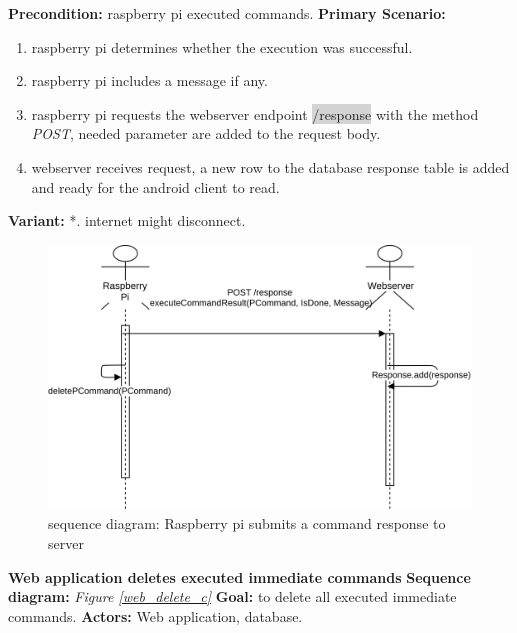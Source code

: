 \documentclass[12pt, oneside, a4paper]{book}
\newcommand{\code}[1]{{\color{red}\colorbox{lightgray}{#1}}}
\newcommand\boldcolor[1]{\textcolor{bold}{\textbf{#1}}}
\begin{document}
				\newline\textbf{Precondition:} raspberry pi executed commands.
				\newline\textbf{Primary Scenario:}	
				\begin{enumerate}[label*=\arabic*.]
					\item raspberry pi determines whether the execution was successful. 
					\item raspberry pi includes a message if any.
					\item  raspberry pi requests the webserver endpoint \code{/response} with the method \textit{POST}, needed parameter are added to the request body.
					\item webserver receives request, a new row to the database response table is added and ready for the android client to read. 
				\end{enumerate}
				\textbf{Variant:}\newline	
				\hspace*{5mm}*. internet might disconnect.\\
				\begin{figure}[H]
					\includegraphics[width=\linewidth]{img/sequence_submit_response.png}
					\caption{sequence diagram: Raspberry pi submits a command response to server}
					\label{rp_response}
				\end{figure}
				\newpage\hspace*{-6mm}\boldcolor{Web application deletes executed immediate commands}
				\newline\textbf{Sequence diagram:} \textit{Figure \ref{web_delete_c}}
				\newline\textbf{Goal:} to delete all executed immediate commands.
				\newline\textbf{Actors:} Web application, database.
\end{document}

